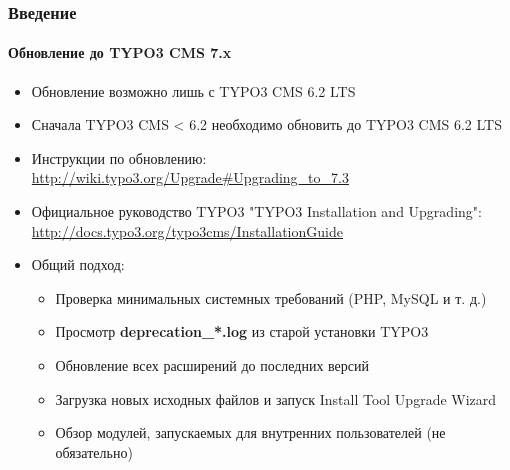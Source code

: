 \begin{frame}[fragile]
	\frametitle{Введение}
	\framesubtitle{Обновление до TYPO3 CMS 7.x}

	\begin{itemize}
		\item Обновление возможно лишь с TYPO3 CMS 6.2 LTS
		\item Сначала TYPO3 CMS < 6.2 необходимо обновить до TYPO3 CMS 6.2 LTS
	\end{itemize}

	\begin{itemize}

		\item Инструкции по обновлению:\newline
			\smaller\url{http://wiki.typo3.org/Upgrade#Upgrading_to_7.3}\normalsize
		\item Официальное руководство TYPO3 "TYPO3 Installation and Upgrading":
			\smaller\url{http://docs.typo3.org/typo3cms/InstallationGuide}\normalsize
		\item Общий подход:
			\begin{itemize}
				\item \smaller Проверка минимальных системных требований \small(PHP, MySQL и т. д.)
				\item \smaller Просмотр \textbf{deprecation\_*.log} из старой установки TYPO3
				\item \smaller Обновление всех расширений до последних версий
				\item \smaller Загрузка новых исходных файлов и запуск Install Tool \textrightarrow Upgrade Wizard
				\item \smaller Обзор модулей, запускаемых для внутренних пользователей (не обязательно)
			\end{itemize}
	\end{itemize}

\end{frame}

